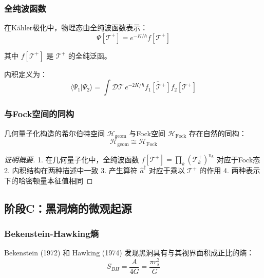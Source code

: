 \subsubsection{全纯波函数}

在Kähler极化中，物理态由全纯波函数表示：
\begin{equation}
    \Psi[\mathcal{T}^+] = e^{-K/\hbar} f[\mathcal{T}^+]
\end{equation}

其中 $f[\mathcal{T}^+]$ 是 $\mathcal{T}^+$ 的全纯泛函。

内积定义为：
\begin{equation}
    \langle\Psi_1 | \Psi_2\rangle = \int \mathcal{D}\mathcal{T} \, e^{-2K/\hbar} \overline{f_1[\mathcal{T}^+]} f_2[\mathcal{T}^+]
\end{equation}

\subsubsection{与Fock空间的同构}

\begin{theorem}[几何量子化与Fock表示等价]
几何量子化构造的希尔伯特空间 $\mathcal{H}_{\text{geom}}$ 与Fock空间 $\mathcal{H}_{\text{Fock}}$ 存在自然的同构：
\begin{equation}
    \mathcal{H}_{\text{geom}} \cong \mathcal{H}_{\text{Fock}}
\end{equation}
\end{theorem}

\begin{proof}[证明概要]
1. 在几何量子化中，全纯波函数 $f[\mathcal{T}^+] = \prod_k (\mathcal{T}^+_k)^{n_k}$ 对应于Fock态
2. 内积结构在两种描述中一致
3. 产生算符 $\hat{a}^\dagger$ 对应于乘以 $\mathcal{T}^+$ 的作用
4. 两种表示下的哈密顿量本征值相同
\end{proof}

\subsection{阶段C：黑洞熵的微观起源}
\label{subsec:bh_entropy}

\subsubsection{Bekenstein-Hawking熵}

Bekenstein (1972) 和 Hawking (1974) 发现黑洞具有与其视界面积成正比的熵：
\begin{equation}
    S_{BH} = \frac{A}{4G} = \frac{\pi r_s^2}{G}
\end{equation}

